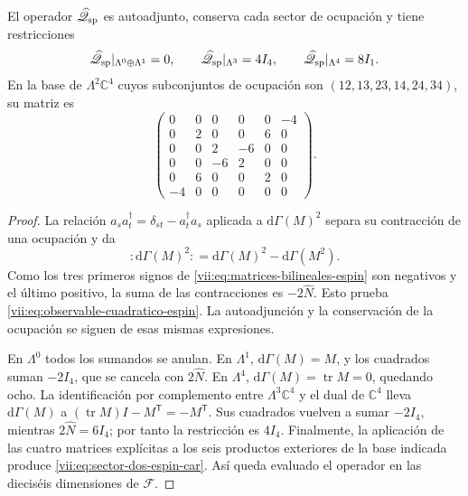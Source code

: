 \begin{proposition}
\label{vii:prop:operador-espin-car}
El operador \(\widehat{\mathscr Q}_{\rm sp}\) es autoadjunto,
conserva cada sector de ocupación y tiene restricciones
\begin{equation}
 \widehat{\mathscr Q}_{\rm sp}|_{\Lambda^0\oplus\Lambda^1}=0,
 \qquad
 \widehat{\mathscr Q}_{\rm sp}|_{\Lambda^3}=4I_4,
 \qquad
 \widehat{\mathscr Q}_{\rm sp}|_{\Lambda^4}=8I_1.
 \label{vii:eq:sectores-espin-car}
\end{equation}
En la base de \(\Lambda^2\mathbb C^4\) cuyos subconjuntos de
ocupación son \((12,13,23,14,24,34)\), su matriz es
\begin{equation}
 \begin{pmatrix}
 0&0&0&0&0&-4\\
 0&2&0&0&6&0\\
 0&0&2&-6&0&0\\
 0&0&-6&2&0&0\\
 0&6&0&0&2&0\\
 -4&0&0&0&0&0
 \end{pmatrix}.
 \label{vii:eq:sector-dos-espin-car}
\end{equation}
\end{proposition}
\begin{proof}
La relación \(a_s a_t^\dagger=\delta_{st}-a_t^\dagger a_s\)
aplicada a \(\mathrm d\Gamma(M)^2\) separa su contracción de
una ocupación y da
\[
 :\!\mathrm d\Gamma(M)^2\!:
 =\mathrm d\Gamma(M)^2-\mathrm d\Gamma(M^2).
\]
Como los tres primeros signos de
\eqref{vii:eq:matrices-bilineales-espin} son negativos y el último
positivo, la suma de las contracciones es \(-2\widehat N\).
Esto prueba \eqref{vii:eq:observable-cuadratico-espin}.
La autoadjunción y la conservación de la ocupación se siguen de
esas mismas expresiones.

En \(\Lambda^0\) todos los sumandos se anulan. En \(\Lambda^1\),
\(\mathrm d\Gamma(M)=M\), y los cuadrados suman \(-2I_4\),
que se cancela con \(2\widehat N\). En \(\Lambda^4\),
\(\mathrm d\Gamma(M)=\operatorname{tr}M=0\), quedando ocho.
La identificación por complemento entre \(\Lambda^3\mathbb C^4\)
y el dual de \(\mathbb C^4\) lleva
\(\mathrm d\Gamma(M)\) a
\((\operatorname{tr}M)I-M^{\mathsf T}=-M^{\mathsf T}\).
Sus cuadrados vuelven a sumar \(-2I_4\), mientras
\(2\widehat N=6I_4\); por tanto la restricción es \(4I_4\).
Finalmente, la aplicación de las cuatro matrices explícitas a los
seis productos exteriores de la base indicada produce
\eqref{vii:eq:sector-dos-espin-car}. Así queda evaluado el operador
en las dieciséis dimensiones de \(\mathcal F\).
\end{proof}

